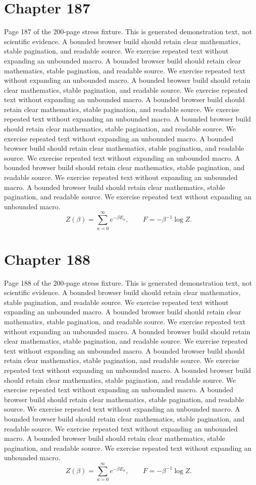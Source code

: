 \documentclass[11pt]{article}
\begin{document}
\section*{Chapter 187}
Page 187 of the 200-page stress fixture. This is generated demonstration text, not scientific evidence.
A bounded browser build should retain clear mathematics, stable pagination, and readable source. We exercise repeated text without expanding an unbounded macro.
A bounded browser build should retain clear mathematics, stable pagination, and readable source. We exercise repeated text without expanding an unbounded macro.
A bounded browser build should retain clear mathematics, stable pagination, and readable source. We exercise repeated text without expanding an unbounded macro.
A bounded browser build should retain clear mathematics, stable pagination, and readable source. We exercise repeated text without expanding an unbounded macro.
A bounded browser build should retain clear mathematics, stable pagination, and readable source. We exercise repeated text without expanding an unbounded macro.
A bounded browser build should retain clear mathematics, stable pagination, and readable source. We exercise repeated text without expanding an unbounded macro.
A bounded browser build should retain clear mathematics, stable pagination, and readable source. We exercise repeated text without expanding an unbounded macro.
A bounded browser build should retain clear mathematics, stable pagination, and readable source. We exercise repeated text without expanding an unbounded macro.
\[Z(\beta)=\sum_{n=0}^{\infty}e^{-\beta E_n},\qquad F=-\beta^{-1}\log Z.\]
\newpage
\section*{Chapter 188}
Page 188 of the 200-page stress fixture. This is generated demonstration text, not scientific evidence.
A bounded browser build should retain clear mathematics, stable pagination, and readable source. We exercise repeated text without expanding an unbounded macro.
A bounded browser build should retain clear mathematics, stable pagination, and readable source. We exercise repeated text without expanding an unbounded macro.
A bounded browser build should retain clear mathematics, stable pagination, and readable source. We exercise repeated text without expanding an unbounded macro.
A bounded browser build should retain clear mathematics, stable pagination, and readable source. We exercise repeated text without expanding an unbounded macro.
A bounded browser build should retain clear mathematics, stable pagination, and readable source. We exercise repeated text without expanding an unbounded macro.
A bounded browser build should retain clear mathematics, stable pagination, and readable source. We exercise repeated text without expanding an unbounded macro.
A bounded browser build should retain clear mathematics, stable pagination, and readable source. We exercise repeated text without expanding an unbounded macro.
A bounded browser build should retain clear mathematics, stable pagination, and readable source. We exercise repeated text without expanding an unbounded macro.
\[Z(\beta)=\sum_{n=0}^{\infty}e^{-\beta E_n},\qquad F=-\beta^{-1}\log Z.\]
\newpage
\end{document}
